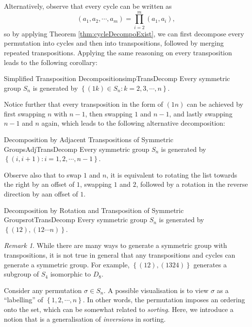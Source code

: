 \documentclass[math]{amznotes}
\theoremstyle{remark}
\newtheorem*{remark}{Remark}
\newcommand{\0}{\mathbf{0}}
\newcommand{\1}{\mathbf{1}}
\begin{document}
Alternatively, observe that every cycle can be written as 
\begin{equation*}
    \left(a_1, a_2, \cdots, a_m\right) = \prod_{i = 2}^{m}\left(a_1, a_i\right),
\end{equation*}
so by applying Theorem \ref{thm:cycleDecompoExist}, we can first decompose every permutation into cycles and then into transpositions, followed by merging repeated transpositions. Applying the same reasoning on every transposition leads to the following corollary:
\begin{corbox}{Simplified Transposition Decomposition}{simpTransDecomp}
    Every symmetric group $S_n$ is generated by $\left\{\left(1k\right) \in S_n \colon k = 2, 3, \cdots, n\right\}$.
\end{corbox}
Notice further that every transposition in the form of $\left(1n\right)$ can be achieved by first swapping $n$ with $n - 1$, then swapping $1$ and $n - 1$, and lastly swapping $n - 1$ and $n$ again, which leads to the following alternative decomposition:
\begin{corbox}{\small Decomposition by Adjacent Transpositions of Symmetric Groups}{AdjTransDecomp}
    Every symmetric group $S_n$ is generated by $\left\{\left(i, i + 1\right) \colon i = 1, 2, \cdots, n - 1\right\}$.
\end{corbox}
Observe also that to swap $1$ and $n$, it is equivalent to rotating the list towards the right by an offset of $1$, swapping $1$ and $2$, followed by a rotation in the reverse direction by aan offset of $1$.
\begin{corbox}{\small Decomposition by Rotation and Transposition of Symmetric Groups}{rotTransDecomp}
    Every symmetric group $S_n$ is generated by $\left\{\left(12\right), \left(12\cdots n\right)\right\}$.
\end{corbox}
\begin{notebox}
    \begin{remark}
        While there are many ways to generate a symmetric group with transpositions, it is not true in general that any transpositions and cycles can generate a symmetric group. For example, $\left\{\left(12\right), \left(1324\right)\right\}$ generates a subgroup of $S_4$ isomorphic to $D_8$.
    \end{remark}
\end{notebox}
Consider any permutation $\sigma \in S_n$. A possible visualisation is to view $\sigma$ as a ``labelling'' of $\left\{1, 2, \cdots, n\right\}$. In other words, the permutation imposes an ordering onto the set, which can be somewhat related to \textit{sorting}. Here, we introduce a notion that is a generalisation of \textit{inversions} in sorting.
\end{document}
